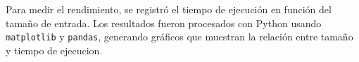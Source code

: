 Para medir el rendimiento, se registró el tiempo de ejecución en función del tamaño de entrada. 
Los resultados fueron procesados con Python usando \texttt{matplotlib} y \texttt{pandas}, generando gráficos que muestran 
la relación entre tamaño y tiempo de ejecucion.



